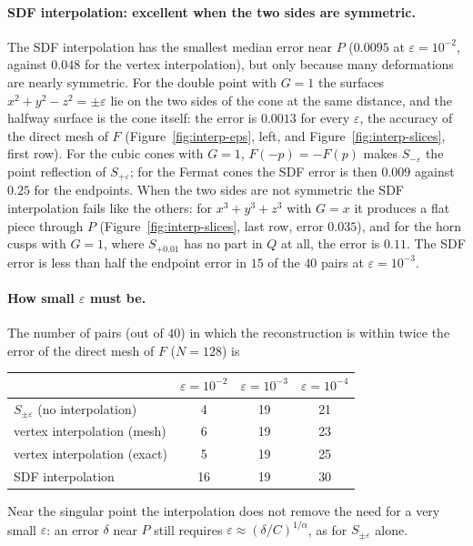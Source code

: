 \documentclass[12pt, a4paper]{article}
\theoremstyle{plain}
\theoremstyle{definition}
\theoremstyle{remark}
\theoremstyle{definition}
\begin{document}
\paragraph{SDF interpolation: excellent when the two sides are symmetric.} The SDF
interpolation has the smallest median error near $P$ ($0.0095$ at
$\varepsilon=10^{-2}$, against $0.048$ for the vertex interpolation), but only
because many deformations are nearly symmetric. For the double point with $G=1$
the surfaces $x^2+y^2-z^2=\pm\varepsilon$ lie on the two sides of the cone at the
same distance, and the halfway surface is the cone itself: the error is $0.0013$
for every $\varepsilon$, the accuracy of the direct mesh of $F$
(Figure~\ref{fig:interp-eps}, left, and Figure~\ref{fig:interp-slices}, first
row). For the cubic cones with $G=1$, $F(-p)=-F(p)$ makes $S_{-\varepsilon}$ the
point reflection of $S_{+\varepsilon}$; for the Fermat cones the SDF error is then
$0.009$ against $0.25$ for the endpoints. When the two sides are not symmetric the SDF interpolation
fails like the others: for $x^3+y^3+z^3$ with $G=x$ it produces a flat piece
through $P$ (Figure~\ref{fig:interp-slices}, last row, error $0.035$), and for the
horn cusps with $G=1$, where $S_{+0.01}$ has no part in $Q$ at all, the error is
$0.11$. The SDF error is less than half the endpoint error in $15$ of the $40$ pairs
at $\varepsilon=10^{-3}$.

\paragraph{How small $\varepsilon$ must be.} The number of pairs (out of $40$) in
which the reconstruction is within twice the error of the direct mesh of $F$
($N=128$) is
\begin{center}
\small
\begin{tabular}{l c c c}
\toprule
& $\varepsilon=10^{-2}$ & $\varepsilon=10^{-3}$ & $\varepsilon=10^{-4}$ \\
\midrule
$S_{\pm\varepsilon}$ (no interpolation) & 4 & 19 & 21 \\
vertex interpolation (mesh) & 6 & 19 & 23 \\
vertex interpolation (exact) & 5 & 19 & 25 \\
SDF interpolation & 16 & 19 & 30 \\
\bottomrule
\end{tabular}
\end{center}
Near the singular point the interpolation does not remove the need for a very
small $\varepsilon$: an error $\delta$ near $P$ still requires
$\varepsilon\approx(\delta/C)^{1/\alpha}$, as for $S_{\pm\varepsilon}$ alone.
\end{document}
